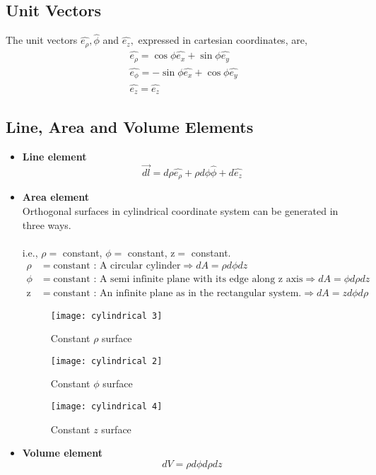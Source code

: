 \subsection{ Unit Vectors}
The unit vectors $\hat{e_{\rho}}, \hat{\phi}$ and $\hat{e_{z}},$ expressed in cartesian coordinates, are,
$$
\begin{array}{l}
\hat{e_{\rho}}=\cos \phi \hat{e_{x}}+\sin \phi \hat{e_{y}} \\
\hat{e_{\phi}}=-\sin \phi \hat{e_{x}}+\cos \phi \hat{e_{y}}\\
\hat{e_{z}}=\hat{e_{z}}
\end{array}
$$

\subsection{Line, Area and Volume Elements}
\begin{itemize}
	\item  \textbf{Line element} 
	$$
	\overrightarrow{d l}= d \rho \hat{e_{\rho}}+\rho d \phi \hat{\phi}+d \hat{e_{z}}
	$$
	
	\item \textbf{Area element }
	\\ Orthogonal surfaces in cylindrical coordinate system can be generated in three ways.\\\\ i.e., $\rho=$ constant,  $\phi=$ constant,
	$\mathrm{z}=$ constant.
	\begin{align*}
	\rho&= \text{constant : A circular cylinder} \Rightarrow d A=\rho d \phi d z\\
	\phi&=\text{constant : A semi infinite plane with its edge along $\mathrm{z}$ axis} \Rightarrow d A= \phi d\rho   d z \\
	\mathrm{z}&= \text{constant : An infinite plane as in the rectangular system.}\Rightarrow d A= zd\phi d\rho   
	\end{align*}
	
	
	
	\begin{figure}[h]
		\begin{minipage}{0.30\textwidth}
			\texttt{[image: cylindrical 3]}
			\caption{Constant $\rho$ surface}
			
		\end{minipage}\hspace{0.5cm}
		\begin{minipage}{0.35\textwidth}
			\texttt{[image: cylindrical 2]}
			\caption{Constant $\phi$ surface}
		\end{minipage}
		\begin{minipage}{0.30\textwidth}
			\texttt{[image: cylindrical 4]}
			\caption{Constant $z$ surface}
		\end{minipage}
	\end{figure}
	\item   \textbf{Volume element}
	$$
	d V=\rho d \phi d \rho d z
	$$
	\end {itemize}
	
